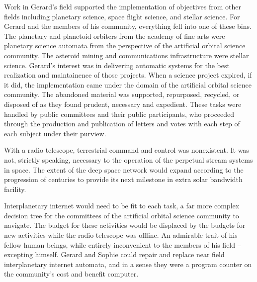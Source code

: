 

Work in Gerard's field supported the implementation of objectives from
other fields including planetary science, space flight science, and
stellar science.  For Gerard and the members of his community,
everything fell into one of these bins.  The planetary and planetoid
orbiters from the academy of fine arts were planetary science automata
from the perspective of the artificial orbital science community.  The
asteroid mining and communications infrastructure were stellar
science.  Gerard's interest was in delivering automatic systems for
the best realization and maintainence of those projects.  When a
science project expired, if it did, the implementation came under the
domain of the artificial orbital science community.  The abandoned
material was supported, repurposed, recycled, or disposed of as they
found prudent, necessary and expedient.  These tasks were handled by
public committees and their public participants, who proceeded through
the production and publication of letters and votes with each step of
each subject under their purview.  

With a radio telescope, terrestrial command and control was
nonexistent.  It was not, strictly speaking, necessary to the
operation of the perpetual stream systems in space.  The extent of the
deep space network would expand according to the progression of
centuries to provide its next milestone in extra solar bandwidth
facility.  

Interplanetary internet would need to be fit to each task, a far more
complex decision tree for the committees of the artificial orbital
science community to navigate.  The budget for these activities would
be displaced by the budgets for new activities while the radio
telescope was offline.  An admirable trait of his fellow human beings,
while entirely inconvenient to the members of his field -- excepting
himself.  Gerard and Sophie could repair and replace near field
interplanetary internet automata, and in a sense they were a program
counter on the community's cost and benefit computer.

\bye

